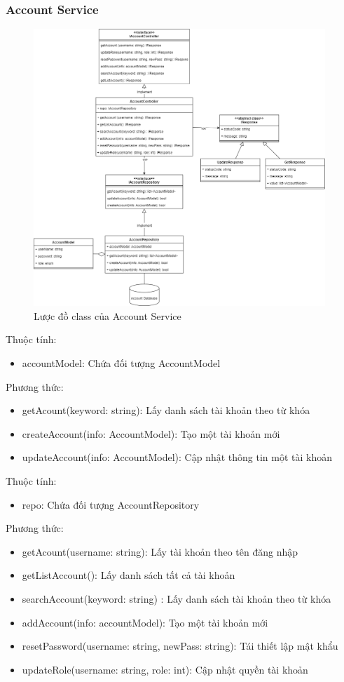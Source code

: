 \subsubsection{Account Service}
\begin{figure}[!htp]
	\centering
	\includegraphics[width=11cm]{img/Architecture/service/AccountService.png}
	\newline
	\caption{Lược đồ class của Account Service}
\end{figure}

Thuộc tính:
\begin{itemize}
	\item accountModel: Chứa đối tượng AccountModel
\end{itemize}
Phương thức:
\begin{itemize}
	\item getAcount(keyword: string): Lấy danh sách tài khoản theo từ khóa
	\item createAccount(info: AccountModel): Tạo một tài khoản mới
	\item updateAccount(info: AccountModel): Cập nhật thông tin một tài khoản
\end{itemize}

Thuộc tính:
\begin{itemize}
	\item repo: Chứa đối tượng AccountRepository
\end{itemize}
Phương thức:
\begin{itemize}
	\item getAcount(username: string): Lấy tài khoản theo tên đăng nhập
	\item getListAccount(): Lấy danh sách tất cả tài khoản
	\item searchAccount(keyword: string) : Lấy danh sách tài khoản theo từ khóa
	\item addAccount(info: accountModel): Tạo một tài khoản mới
	\item resetPassword(username: string, newPass: string): Tái thiết lập mật khẩu	
	\item updateRole(username: string, role: int): Cập nhật quyền tài khoản
\end{itemize}


